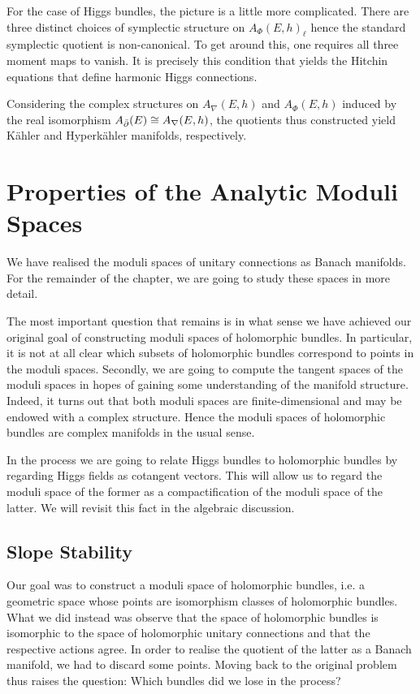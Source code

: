 \documentclass[12pt]{ociamthesis}  %
\begin{document}
For the case of Higgs bundles, the picture is a little more complicated.
There are three distinct choices of symplectic structure on
$A_\Phi(E,h)_\ell$ hence the standard symplectic quotient is non-canonical.
To get around this, one requires all three moment maps to vanish. It is
precisely this condition that yields the Hitchin equations that
define harmonic Higgs connections.

Considering the complex structures on $A_\nabla(E,h)$ and $A_\Phi(E,h)$ induced
by the real isomorphism $A_{\bar{\partial}}(E)\cong A_\nabla(E,h)$, the quotients
thus constructed yield K\"ahler and Hyperk\"ahler manifolds, respectively.

\section{Properties of the Analytic Moduli Spaces}\label{sec:properties_of_analytic_spaces}

We have realised the moduli spaces of unitary connections as
Banach manifolds. For the remainder of the chapter, we are going to
study these spaces in more detail.

The most important question that remains is in what sense we have
achieved our original goal of constructing moduli spaces of
holomorphic bundles. In particular, it is not at all clear which subsets
of holomorphic bundles correspond to points in the moduli spaces.
Secondly, we are going to compute the tangent spaces of the moduli
spaces in hopes of gaining some understanding of the manifold structure.
Indeed, it turns out that both moduli spaces are finite-dimensional
and may be endowed with a complex structure. Hence the moduli spaces
of holomorphic bundles are complex manifolds in the usual sense.

In the process we are going to relate Higgs bundles to holomorphic bundles
by regarding Higgs fields as cotangent vectors. This will allow us to
regard the moduli space of the former as a compactification of the moduli
space of the latter. We will revisit this fact in the algebraic discussion.

\subsection{Slope Stability}\label{sec:analytic_stable_bundles}

Our goal was to construct a moduli space of holomorphic bundles,
i.e. a geometric space whose points are isomorphism classes of
holomorphic bundles. What we did instead was observe that the space
of holomorphic bundles is isomorphic to the space of holomorphic unitary
connections and that the respective actions agree. In order to realise
the quotient of the latter as a Banach manifold, we had to discard
some points. Moving back to the original problem thus raises
the question: Which bundles did we lose in the process?
\end{document}
